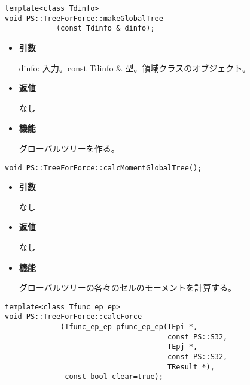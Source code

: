 
\begin{screen}
\begin{verbatim}
template<class Tdinfo>
void PS::TreeForForce::makeGlobalTree
            (const Tdinfo & dinfo);        
\end{verbatim}
\end{screen}

\begin{itemize}

\item {\bf 引数}

dinfo: 入力。const Tdinfo \& 型。領域クラスのオブジェクト。

\item {\bf 返値}

なし

\item {\bf 機能}

グローバルツリーを作る。

\end{itemize}


\begin{screen}
\begin{verbatim}
void PS::TreeForForce::calcMomentGlobalTree();
\end{verbatim}
\end{screen}

\begin{itemize}

\item {\bf 引数}

なし

\item {\bf 返値}

なし

\item {\bf 機能}

グローバルツリーの各々のセルのモーメントを計算する。

\end{itemize}


\begin{screen}
\begin{verbatim}
template<class Tfunc_ep_ep>
void PS::TreeForForce::calcForce
             (Tfunc_ep_ep pfunc_ep_ep(TEpi *,
                                      const PS::S32,
                                      TEpj *,
                                      const PS::S32,
                                      TResult *),
              const bool clear=true);
\end{verbatim}
\end{screen}

